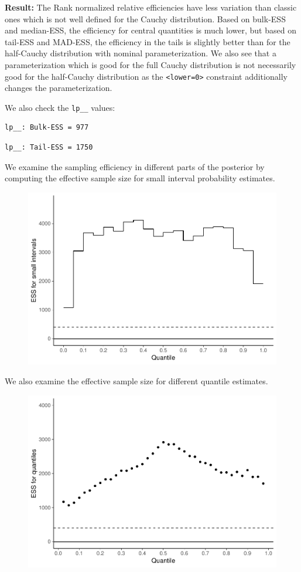 \documentclass[american,]{article}
\begin{document}
\textbf{Result:} The Rank normalized relative efficiencies have less
variation than classic ones which is not well defined for the Cauchy
distribution. Based on bulk-ESS and median-ESS, the efficiency for
central quantities is much lower, but based on tail-ESS and MAD-ESS, the
efficiency in the tails is slightly better than for the half-Cauchy
distribution with nominal parameterization. We also see that a
parameterization which is good for the full Cauchy distribution is not
necessarily good for the half-Cauchy distribution as the
\texttt{\textless{}lower=0\textgreater{}} constraint additionally
changes the parameterization.

We also check the \texttt{lp\_\_} values:

\begin{verbatim}
lp__: Bulk-ESS = 977
\end{verbatim}

\begin{verbatim}
lp__: Tail-ESS = 1750
\end{verbatim}

We examine the sampling efficiency in different parts of the posterior
by computing the effective sample size for small interval probability
estimates.

\begin{figure}[tp]
  \centering
  \includegraphics[width=0.6\linewidth]{graphics/local-ess-fit-half-reparam-1.pdf}
\end{figure}

We also examine the effective sample size for different quantile
estimates.

\begin{figure}[tp]
  \centering
  \includegraphics[width=0.6\linewidth]{graphics/quantile-ess-fit-half-reparam-1.pdf}
\end{figure}
\end{document}
